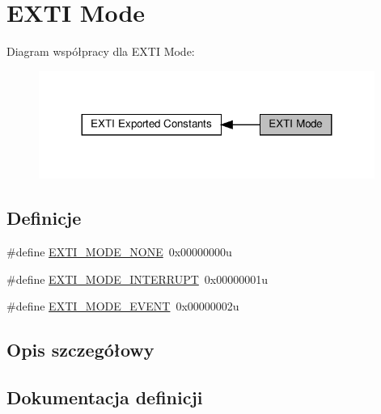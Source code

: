 \hypertarget{group___e_x_t_i___mode}{}\section{E\+X\+TI Mode}
\label{group___e_x_t_i___mode}
Diagram współpracy dla E\+X\+TI Mode\+:\nopagebreak
\begin{figure}[H]
\begin{center}
\leavevmode
\includegraphics[width=311pt]{group___e_x_t_i___mode}
\end{center}
\end{figure}
\subsection*{Definicje}
\begin{DoxyCompactItemize}
\item 
\#define \hyperlink{group___e_x_t_i___mode_ga9b50ed09da5b1dd0619d8792f142b049}{E\+X\+T\+I\+\_\+\+M\+O\+D\+E\+\_\+\+N\+O\+NE}~0x00000000u
\item 
\#define \hyperlink{group___e_x_t_i___mode_gae1e032ec592296be21f416a79a44f4f5}{E\+X\+T\+I\+\_\+\+M\+O\+D\+E\+\_\+\+I\+N\+T\+E\+R\+R\+U\+PT}~0x00000001u
\item 
\#define \hyperlink{group___e_x_t_i___mode_ga672fef88f86b5d8a421194e3dac0f2e1}{E\+X\+T\+I\+\_\+\+M\+O\+D\+E\+\_\+\+E\+V\+E\+NT}~0x00000002u
\end{DoxyCompactItemize}


\subsection{Opis szczegółowy}


\subsection{Dokumentacja definicji}
\mbox{\label{group___e_x_t_i___mode_ga672fef88f86b5d8a421194e3dac0f2e1}} 
